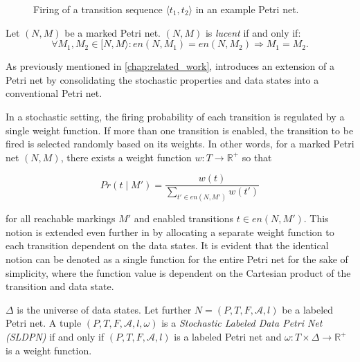 \begin{figure}[H]
\begin{subfigure}[t]{0.31\textwidth}
    \end{subfigure}
    \caption{Firing of a transition sequence $\langle t_1, t_2 \rangle$ in an example Petri net.}
    \label{fig:firing_sequence}
\end{figure}

\begin{definition}[Lucency]
    Let $(N, M)$ be a marked Petri net. $(N, M)$ is \emph{lucent} if and only if:
    \[
        \forall M_1, M_2 \in [N, M \rangle: en(N, M_1) = en(N, M_2) \Rightarrow M_1 = M_2.
    \]
\end{definition}

As previously mentioned in \cref{chap:related_work}, \cite{sldpn} introduces an extension of a Petri net by consolidating the stochastic properties and data states into a conventional Petri net.

In a stochastic setting, the firing probability of each transition is regulated by a single weight function. If more than one transition is enabled, the transition to be fired is selected randomly based on its weights. In other words, for a marked Petri net $(N, M)$, there exists a weight function $w: T \rightarrow \mathbb{R}^+$ so that 

\[ 
    Pr(t \mid M') = \frac{w(t)}{\sum_{t' \in en(N, M')} w(t')}
\]

for all reachable markings $M'$ and enabled transitions $t \in en(N, M')$. This notion is extended even further in \cite{sldpn} by allocating a separate weight function to each transition dependent on the data states. It is evident that the identical notion can be denoted as a single function for the entire Petri net for the sake of simplicity, where the function value is dependent on the Cartesian product of the transition and data state.

\begin{definition}
    $\Delta$ is the universe of data states. Let further $N = (P, T, F, \mathcal{A}, l)$ be a labeled Petri net. A tuple $(P, T, F, \mathcal{A}, l, \omega)$ is a \emph{Stochastic Labeled Data Petri Net (SLDPN)} if and only if $(P, T, F, \mathcal{A}, l)$ is a labeled Petri net and $\omega: T \times \Delta \to \mathbb{R}^+$ is a weight function.
\end{definition}

